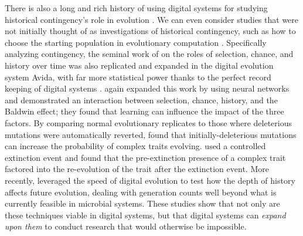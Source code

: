 There is also a long and rich history of using digital systems for studying historical contingency's role in evolution \citep{taylorReplayingTapeInvestigation1998}.
We can even consider studies that were not initially thought of as investigations of historical contingency, such as how to choose the starting population in evolutionary computation \citep{burkeInitializationStrategiesDiversity1998, schmidtIncorporatingExpertKnowledge2009}.
Specifically analyzing contingency, the seminal work of \citet{travisanoExperimentalTestsRoles1995} on the roles of selection, chance, and history over time was also replicated and expanded in the digital evolution system Avida, with far more statistical power thanks to the perfect record keeping of digital systems \citep{wagenaarInfluenceChanceHistory2004}.
\citet{braughtEffectsLearningRoles2007} again expanded this work by using neural networks and demonstrated an interaction between selection, chance, history, and the Baldwin effect; they found that learning can influence the impact of the three factors.
By comparing normal evolutionary replicates to those where deleterious mutations were automatically reverted, \citet{covertiiiExperimentsRoleDeleterious2013} found that initially-deleterious mutations can increase the probability of complex traits evolving.
\citet{yedidHistoricalContingentFactors2008} used a controlled extinction event and found that the pre-extinction presence of a complex trait factored into the re-evolution of the trait after the extinction event. 
More recently, \citet{bundyHowFootprintHistory2021} leveraged the speed of digital evolution to test how the depth of history affects future evolution, dealing with generation counts well beyond what is currently feasible in microbial systems. 
These studies show that not only are these techniques viable in digital systems, but that digital systems can \textit{expand upon them} to conduct research that would otherwise be impossible.